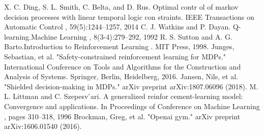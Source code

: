 \documentclass[letterpaper, 10 pt, conference]{ieeeconf}  %
\begin{document}
\begin{thebibliography}{99}
 X.  C.  Ding,  S.  L.  Smith,  C.  Belta,  and  D.  Rus.    Optimal  contr ol of  markov  decision  processes  with  linear  temporal  logic  con straints. IEEE Transactions  on Automatic Control ,  59(5):1244–1257,  2014
C.  J.  Watkins  and  P.  Dayan.   Q-learning.Machine  Learning ,  8(3-4):279–292,  1992
 R. S. Sutton and A. G. Barto.Introduction to Reinforcement Learning . MIT Press, 1998.
Junges, Sebastian, et al. "Safety-constrained reinforcement learning for MDPs." International Conference on Tools and Algorithms for the Construction and Analysis of Systems. Springer, Berlin, Heidelberg, 2016.
Jansen, Nils, et al. "Shielded decision-making in MDPs." arXiv preprint arXiv:1807.06096 (2018).
 M.  L.  Littman  and  C.  Szepesv ́ari.     A  generalized  reinfor cement-learning  model:  Convergence  and  applications.    In Proceedings  of Conference  on Machine Learning ,  pages 310–318,  1996
Brockman, Greg, et al. "Openai gym." arXiv preprint arXiv:1606.01540 (2016).

\end{thebibliography}
\end{document}
